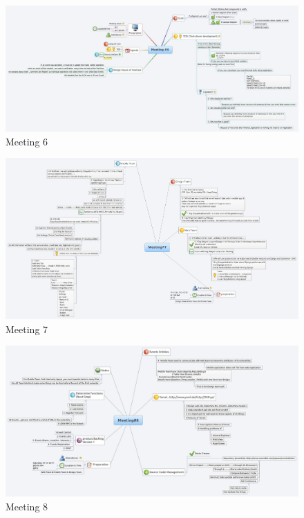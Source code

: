 \documentclass[12pt,a4paper,class,twoside,openany]{report}
\begin{document}
\begin{figure}
\begin{center}
\includegraphics[angle=90, width=3.5 in]{2-5}
\caption{Meeting 6}
\label{fg:2-5}
\end{center}
\end{figure}
 \begin{figure}
\begin{center}
\includegraphics[angle=90, width=4 in]{2-6}
\caption{Meeting 7}
\label{fg:2-6}
\end{center}
\end{figure}
\begin{figure}
\begin{center}
\includegraphics[angle=90, width=4 in]{2-7}
\caption{Meeting 8}
\label{fg:2-7}
\end{center}
\end{figure}
\end{document}
